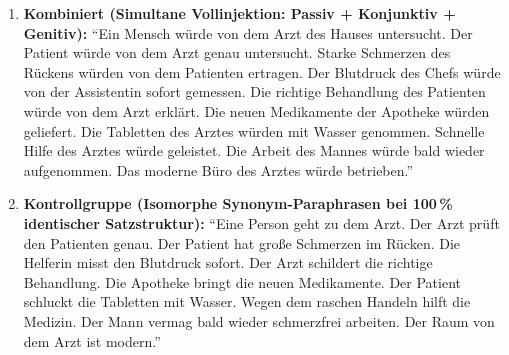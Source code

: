 \begin{enumerate}
    \item \textbf{Kombiniert (Simultane Vollinjektion: Passiv + Konjunktiv + Genitiv):}
    \enquote{Ein Mensch würde von dem Arzt des Hauses untersucht. Der Patient würde von dem Arzt genau untersucht. Starke Schmerzen des Rückens würden von dem Patienten ertragen. Der Blutdruck des Chefs würde von der Assistentin sofort gemessen. Die richtige Behandlung des Patienten würde von dem Arzt erklärt. Die neuen Medikamente der Apotheke würden geliefert. Die Tabletten des Arztes würden mit Wasser genommen. Schnelle Hilfe des Arztes würde geleistet. Die Arbeit des Mannes würde bald wieder aufgenommen. Das moderne Büro des Arztes würde betrieben.}
    
    \item \textbf{Kontrollgruppe (Isomorphe Synonym-Paraphrasen bei 100\,\% identischer Satzstruktur):}
    \enquote{Eine Person geht zu dem Arzt. Der Arzt prüft den Patienten genau. Der Patient hat große Schmerzen im Rücken. Die Helferin misst den Blutdruck sofort. Der Arzt schildert die richtige Behandlung. Die Apotheke bringt die neuen Medikamente. Der Patient schluckt die Tabletten mit Wasser. Wegen dem raschen Handeln hilft die Medizin. Der Mann vermag bald wieder schmerzfrei arbeiten. Der Raum von dem Arzt ist modern.}
\end{enumerate}